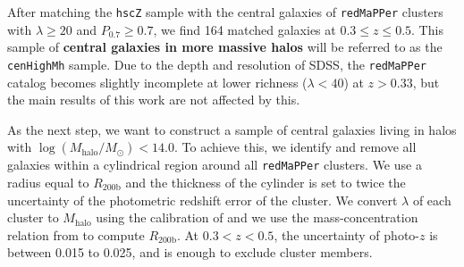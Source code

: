 \documentclass[a4paper,fleqn,usenatbib]{mnras}
\def\arcsec{{\prime\prime}}
\def\redm{\texttt{redMaPPer}}
\def\rbcg{\texttt{cenHighMh}}
\def\mhalo{{$M_{\mathrm{halo}}$}}
\def\logms{{$\log (M_{\star}/M_{\odot})$}}
\def\logmh{{$\log (M_{\mathrm{halo}}/M_{\odot})$}}
\begin{document}
    
    

 
    After matching the \texttt{hscZ} sample with the central galaxies of \redm{} 
    clusters with $\lambda \geq 20$ and $P_{\mathrm{0.7}} \geq 0.7$, we find 164 
    matched galaxies at $0.3 \leq z \leq 0.5$.
    This sample of \textbf{central galaxies in more massive halos} will be referred to 
    as the \rbcg{} sample. 
    Due to the depth and resolution of SDSS, the \redm{} catalog becomes slightly 
    incomplete at lower richness ($\lambda < 40$) at $z > 0.33$, but the main results 
    of this work are not affected by this.
    
    As the next step, we want to construct a sample of central galaxies living in halos 
    with \logmh{}$<14.0$. 
    To achieve this, we identify and remove all galaxies within a cylindrical region 
    around all \redm{} clusters. 
    We use a radius equal to $R_{\mathrm{200b}}$ and the thickness of the cylinder is 
    set to twice the uncertainty of the photometric redshift error of the cluster. 
    We convert $\lambda$ of each cluster to $M_{\mathrm{halo}}$ using the calibration 
    of \citet{Simet2016} and we use the mass-concentration relation from 
    \citet{Diemer2015} to compute $R_{\mathrm{200b}}$. 
    At $0.3 < z < 0.5$, the uncertainty of photo-$z$ is between 0.015 to 0.025, and 
    is enough to exclude cluster members.
    
\end{document}
